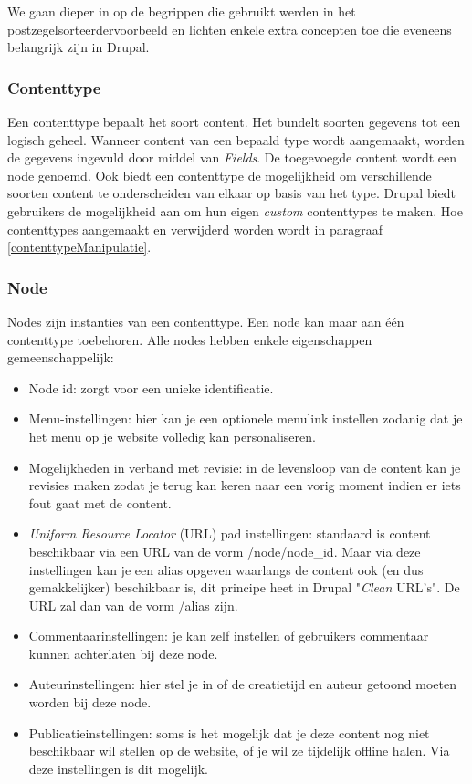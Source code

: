 We gaan dieper in op de begrippen die gebruikt werden in het postzegelsorteerdervoorbeeld en lichten enkele extra concepten toe die eveneens belangrijk zijn in Drupal.

\subsubsection{Contenttype}
Een contenttype bepaalt het soort content. Het bundelt soorten gegevens tot een logisch geheel. Wanneer content van een bepaald type wordt aangemaakt, worden de gegevens ingevuld door middel van \textit{Fields}. De toegevoegde content wordt een node genoemd. Ook biedt een contenttype de mogelijkheid om verschillende soorten content te onderscheiden van elkaar op basis van het type.
Drupal biedt gebruikers de mogelijkheid aan om hun eigen \textit{custom} contenttypes te maken. Hoe contenttypes aangemaakt en verwijderd worden wordt in paragraaf \ref{contenttypeManipulatie}.

\subsubsection{Node}
Nodes zijn instanties van een contenttype. Een node kan maar aan \'{e}\'{e}n contenttype toebehoren.
Alle nodes hebben enkele eigenschappen gemeenschappelijk:
\begin{itemize}
\item Node id: zorgt voor een unieke identificatie.
\item Menu-instellingen: hier kan je een optionele menulink instellen zodanig dat je het menu op je website volledig kan personaliseren.
\item Mogelijkheden in verband met revisie: in de levensloop van de content kan je revisies maken zodat je terug kan keren naar een vorig moment indien er iets fout gaat met de content.
\item \textit{Uniform Resource Locator} (URL)  pad instellingen: standaard is content beschikbaar via een URL van de vorm /node/node\_id. Maar via deze instellingen kan je een alias opgeven waarlangs de content ook (en dus gemakkelijker) beschikbaar is, dit principe heet in Drupal "\textit{Clean} URL's". De URL zal dan van de vorm /alias zijn.
\item Commentaarinstellingen: je kan zelf instellen of gebruikers commentaar kunnen achterlaten bij deze node.
\item Auteurinstellingen: hier stel je in of de creatietijd en auteur getoond moeten worden bij deze node.
\item Publicatieinstellingen: soms is het mogelijk dat je deze content nog niet beschikbaar wil stellen op de website, of je wil ze tijdelijk offline halen. Via deze instellingen is dit mogelijk.
\end{itemize}

